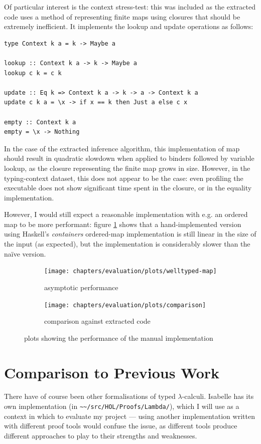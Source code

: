 Of particular interest is the context stress-test: this was included as the extracted code uses a method of representing finite maps using closures that should be extremely inefficient.
It implements the lookup and update operations as follows:

\begin{verbatim}
type Context k a = k -> Maybe a

lookup :: Context k a -> k -> Maybe a
lookup c k = c k

update :: Eq k => Context k a -> k -> a -> Context k a
update c k a = \x -> if x == k then Just a else c x

empty :: Context k a
empty = \x -> Nothing
\end{verbatim}

In the case of the extracted inference algorithm, this implementation of map should result in quadratic slowdown when applied to binders followed by variable lookup, as the closure representing the finite map grows in size.
However, in the typing-context dataset, this does not appear to be the case: even profiling the executable does not show significant time spent in the closure, or in the equality implementation.

However, I would still expect a reasonable implementation with e.g. an ordered map to be more performant: figure \ref{fig:results-map} shows that a hand-implemented version using Haskell's \emph{containers} ordered-map implementation is still linear in the size of the input (as expected), but the implementation is considerably slower than the na\"ive version.

\begin{figure}
\begin{subfigure}{.49\textwidth}
 \centering
 \texttt{[image: chapters/evaluation/plots/welltyped-map]}
 \caption{asymptotic performance}
\end{subfigure}
\begin{subfigure}{.49\textwidth}
 \centering
 \texttt{[image: chapters/evaluation/plots/comparison]}
 \caption{comparison against extracted code}
\end{subfigure}
\caption{plots showing the performance of the manual implementation}
\label{fig:results-map}
\end{figure}

\section{Comparison to Previous Work}
There have of course been other formalisations of typed \(\lambda\)-calculi.
Isabelle has its own implementation (in \texttt{\textasciitilde\textasciitilde/src/HOL/Proofs/Lambda/}), which I will use as a context in which to evaluate my project --- using another implementation written with different proof tools would confuse the issue, as different tools produce different approaches to play to their strengths and weaknesses.

